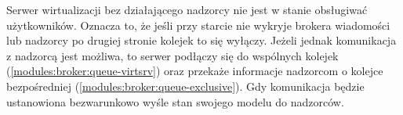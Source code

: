 \documentclass[../opis-rozwiazania.tex]{subfiles}
\begin{document}
Serwer wirtualizacji bez działającego nadzorcy nie jest w stanie obsługiwać użytkowników.
Oznacza to, że jeśli przy starcie nie wykryje brokera wiadomości
lub nadzorcy po drugiej stronie kolejek \parencite{rabbit-ack} to się wyłączy.
Jeżeli jednak komunikacja z nadzorcą jest możliwa, to serwer podłączy się do wspólnych kolejek (\ref{modules:broker:queue-virtsrv})
oraz przekaże informacje nadzorcom o kolejce bezpośredniej (\ref{modules:broker:queue-exclusive}).
Gdy komunikacja będzie ustanowiona bezwarunkowo wyśle stan swojego modelu do nadzorców.
\end{document}
